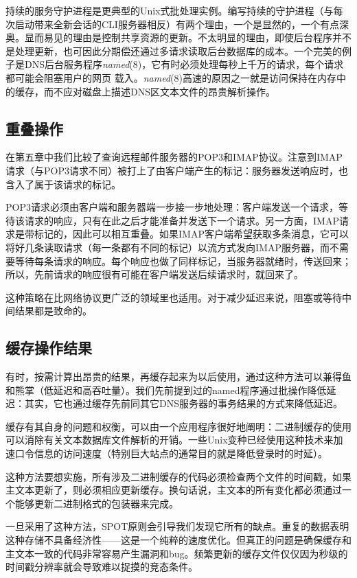 \documentclass[12pt,oneside]{book}
\begin{document}
持续的服务守护进程是更典型的Unix式批处理实例。编写持续的守护进程（与每次启动带来全新会话的CLI服务器相反）有两个理由，一个是显然的，一个有点深奥。显而易见的理由是控制共享资源的更新。不太明显的理由，即使后台程序并不是处理更新，也可因此分期偿还通过多请求读取后台数据库的成本。一个完美的例子是DNS后台服务程序\textit{named}(8)，它有时必须处理每秒上千万的请求，每个请求都可能会阻塞用户的网页
载入。\textit{named}(8)高速的原因之一就是访问保持在内存中的缓存，而不应对磁盘上描述DNS区文本文件的昂贵解析操作。


\subsection{重叠操作}
在第五章中我们比较了查询远程邮件服务器的POP3和IMAP协议。注意到IMAP请求（与POP3请求不同）被打上了由客户端产生的标记：服务器发送响应时，也含入了属于该请求的标记。

POP3请求必须由客户端和服务器端一步接一步地处理：客户端发送一个请求，等待该请求的响应，只有在此之后才能准备并发送下一个请求。另一方面，IMAP请求是带标记的，因此可以相互重叠。如果IMAP客户端希望获取多条消息，它可以将好几条读取请求（每一条都有不同的标记）以流方式发向IMAP服务器，而不需要等待每条请求的响应。每个响应也做了同样标记，当服务器就绪时，传送回来；所以，先前请求的响应很有可能在客户端发送后续请求时，就回来了。

这种策略在比网络协议更广泛的领域里也适用。对于减少延迟来说，阻塞或等待中间结果都是致命的。


\subsection{缓存操作结果}
有时，按需计算出昂贵的结果，再缓存起来为以后使用，通过这种方法可以兼得鱼和熊掌（低延迟和高吞吐量）。我们先前提到过的named程序通过批操作降低延迟：其实，它也通过缓存先前同其它DNS服务器的事务结果的方式来降低延迟。

缓存有其自身的问题和权衡，可以由一个应用程序很好地阐明：二进制缓存的使用可以消除有关文本数据库文件解析的开销。一些Unix变种已经使用这种技术来加速口令信息的访问速度（特别巨大站点的通常目的就是降低登录时的时延）。

这种方法要想实施，所有涉及二进制缓存的代码必须检查两个文件的时间戳，如果主文本更新了，则必须相应更新缓存。换句话说，主文本的所有变化都必须通过一个能够更新二进制格式的包装器来完成。

一旦采用了这种方法，SPOT原则会引导我们发现它所有的缺点。重复的数据表明这种存储不具备经济性——这是一个纯粹的速度优化。但真正的问题是确保缓存和主文本一致的代码非常容易产生漏洞和bug。频繁更新的缓存文件仅仅因为秒级的时间戳分辨率就会导致难以捉摸的竞态条件。
\end{document}
